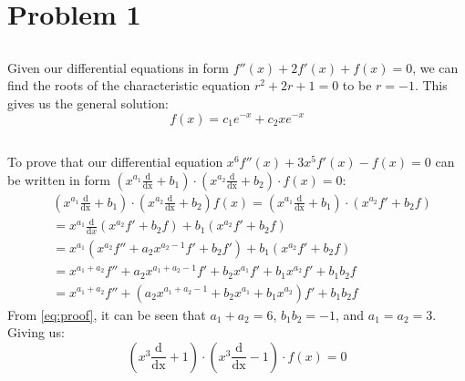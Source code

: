 \documentclass[12pt]{article}
\begin{document}
\renewcommand{\familydefault}{\rmdefault}



\section{Problem 1}
\subsection{} 
Given our differential equations in form $f''(x) + 2f'(x) + f(x) = 0$, we can find the roots of the characteristic equation $r^2 + 2r + 1 = 0$ to be $r = -1$. This gives us the general solution:
\begin{equation}
    f(x) = c_1e^{-x} + c_2xe^{-x}
\end{equation} 
\subsection{}
To prove that our differential equation $x^6f''(x) + 3x^5f'(x) - f(x) = 0$ can be written in form $\left(x^{a_1} \frac{\mathrm{d}}{\mathrm{dx}}+ b_1\right)\cdot\left(x^{a_2} \frac{\mathrm{d}}{\mathrm{dx}}+ b_2\right)\cdot f(x)=0$:
\begin{equation}
    \label {eq:proof}
    \begin{split}
        &\left(x^{a_1} \frac{\mathrm{d}}{\mathrm{dx}}+ b_1\right)\cdot\left(x^{a_2} \frac{\mathrm{d}}{\mathrm{dx}}+ b_2\right)f(x)= \left(x^{a_1} \frac{\mathrm{d}}{\mathrm{dx}}+ b_1\right)\cdot(x^{a_2}f'+b_2f)\\
        &= x^{a_1} \frac{\mathrm{d}}{\mathrm{d}x}\left(x^{a_2}f'+b_2f\right) + b_1\left(x^{a_2}f'+b_2f\right)\\
        &= x^{a_1}\left(x^{a_2}f''+a_2x^{a_2-1}f'+b_2f'\right) + b_1\left(x^{a_2}f'+b_2f\right)\\
        &= x^{a_1 + a_2}f'' + a_2x^{a_1 + a_2 - 1}f' + b_2x^{a_1}f' + b_1x^{a_2}f' + b_1b_2f\\
        &= x^{a_1 + a_2}f'' + \left(a_2x^{a_1 + a_2 - 1} + b_2x^{a_1} + b_1x^{a_2}\right)f' + b_1b_2f
    \end{split}
\end{equation}
From \ref{eq:proof}, it can be seen that $a_1 + a_2 = 6$, $b_1b_2 = -1$, and $a_1 = a_2 = 3$. Giving us:
\begin{equation}
    \left(x^3 \frac{\mathrm{d}}{\mathrm{dx}}+ 1\right)\cdot\left(x^3 \frac{\mathrm{d}}{\mathrm{dx}}- 1\right)\cdot f(x)=0
\end{equation}
\end{document}
